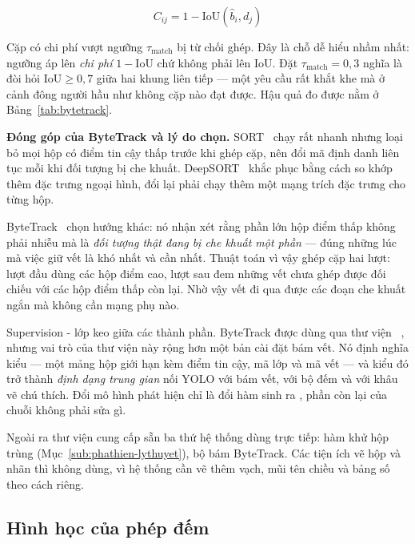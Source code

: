 \begin{equation}
  C_{ij} = 1 - \mathrm{IoU}(\hat{b}_i, d_j)
  \label{eq:cost}
\end{equation}

Cặp có chi phí vượt ngưỡng $\tau_{\text{match}}$ bị từ chối ghép. Đây là chỗ dễ
hiểu nhầm nhất: ngưỡng áp lên \emph{chi phí} $1 - \mathrm{IoU}$ chứ không phải lên
$\mathrm{IoU}$. Đặt $\tau_{\text{match}} = 0{,}3$ nghĩa là đòi hỏi
$\mathrm{IoU} \geq 0{,}7$ giữa hai khung liên tiếp --- một yêu cầu rất khắt khe mà ở
cảnh đông người hầu như không cặp nào đạt được. Hậu quả đo được nằm ở
Bảng~\ref{tab:bytetrack}.

\textbf{Đóng góp của ByteTrack và lý do chọn.} SORT~\cite{bewley2016sort} chạy rất nhanh nhưng loại bỏ mọi hộp
có điểm tin cậy thấp trước khi ghép cặp, nên đổi mã định danh liên tục mỗi khi đối tượng
bị che khuất. DeepSORT~\cite{wojke2017deepsort} khắc phục bằng cách so khớp thêm đặc trưng ngoại hình, đổi lại
phải chạy thêm một mạng trích đặc trưng cho từng hộp.

ByteTrack~\cite{zhang2022bytetrack} chọn hướng khác: nó nhận xét rằng phần lớn hộp điểm thấp không phải nhiễu mà
là \emph{đối tượng thật đang bị che khuất một phần} --- đúng những lúc mà việc giữ vết
là khó nhất và cần nhất. Thuật toán vì vậy ghép cặp hai lượt: lượt đầu dùng các hộp điểm
cao, lượt sau đem những vết chưa ghép được đối chiếu với các hộp điểm thấp còn lại. Nhờ
vậy vết đi qua được các đoạn che khuất ngắn mà không cần mạng phụ nào.

Supervision - lớp keo giữa các thành phần. ByteTrack được dùng qua thư viện
~\cite{supervision2024}, nhưng vai trò của thư viện này rộng hơn một bản cài đặt bám vết. Nó
định nghĩa kiểu  --- một mảng hộp giới hạn kèm điểm tin cậy, mã lớp và
mã vết --- và kiểu đó trở thành \emph{định dạng trung gian} nối YOLO với bám vết, với bộ
đếm và với khâu vẽ chú thích. Đổi mô hình phát hiện chỉ là đổi hàm sinh ra
, phần còn lại của chuỗi không phải sửa gì.

Ngoài ra thư viện cung cấp sẵn ba thứ hệ thống dùng trực tiếp: hàm khử hộp trùng
(Mục~\ref{sub:phathien-lythuyet}), bộ bám ByteTrack. Các tiện ích vẽ hộp và nhãn thì không
dùng, vì hệ thống cần vẽ thêm vạch, mũi tên chiều và bảng số theo cách riêng.


\subsection{Hình học của phép đếm}
\label{sub:hinhhoc}

